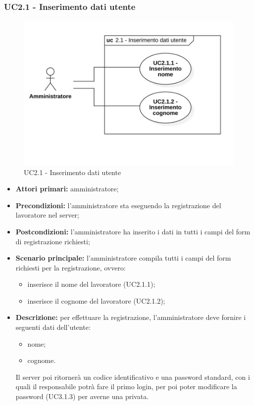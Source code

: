 \subsubsection{UC2.1 - Inserimento dati utente}

\begin{figure}[H]
	\centering
	\includegraphics[scale=0.52]{res/images/uc2-1.png}
	\caption{UC2.1 - Inserimento dati utente}
\end{figure}

\begin{itemize}
	\item 	\textbf{Attori primari:} amministratore;
	\item 	\textbf{Precondizioni:}	l'amministratore sta eseguendo la registrazione del lavoratore nel server;
	\item 	\textbf{Postcondizioni:} l'amministratore ha inserito i dati in tutti i campi del form di registrazione richiesti;
	\item 	\textbf{Scenario principale:} l'amministratore compila tutti i campi del form richiesti per la registrazione, ovvero:
	\begin{itemize}
		\item inserisce il nome del lavoratore (UC2.1.1);
		\item inserisce il cognome del lavoratore (UC2.1.2);
	\end{itemize}
	\item 	\textbf{Descrizione:} per effettuare la registrazione, l'amministratore deve fornire i seguenti dati dell'utente:
	\begin{itemize}
		\item nome;
		\item cognome.
	\end{itemize}
Il server poi ritornerà un codice identificativo e una password standard, con i quali il responsabile potrà fare il primo login, per poi poter modificare la password (UC3.1.3) per averne una privata.
\end{itemize}

